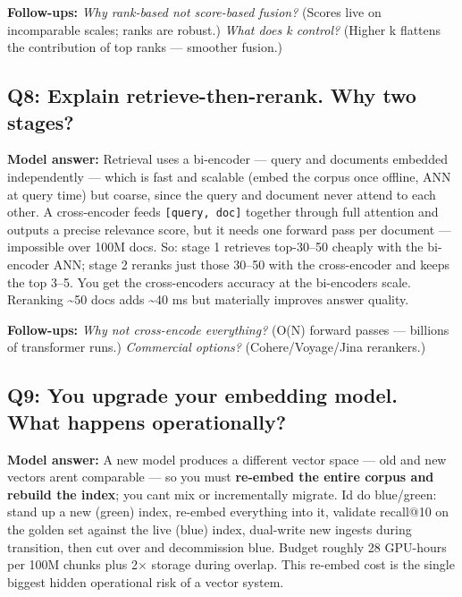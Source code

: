 \documentclass[11pt]{article}
\begin{document}
\textbf{Follow-ups:} \emph{Why rank-based not score-based fusion?} (Scores live on incomparable scales; ranks are robust.) \emph{What does k control?} (Higher k flattens the contribution of top ranks --- smoother fusion.)

\subsection{Q8: Explain retrieve-then-rerank. Why two stages?}\label{q8-explain-retrieve-then-rerank-why-two-stages}

\textbf{Model answer:} Retrieval uses a bi-encoder --- query and documents embedded independently --- which is fast and scalable (embed the corpus once offline, ANN at query time) but coarse, since the query and document never attend to each other. A cross-encoder feeds \texttt{{[}query,\ doc{]}} together through full attention and outputs a precise relevance score, but it needs one forward pass per document --- impossible over 100M docs. So: stage 1 retrieves top-30--50 cheaply with the bi-encoder ANN; stage 2 reranks just those 30--50 with the cross-encoder and keeps the top 3--5. You get the cross-encoder\textquotesingle s accuracy at the bi-encoder\textquotesingle s scale. Reranking \textasciitilde50 docs adds \textasciitilde40 ms but materially improves answer quality.

\textbf{Follow-ups:} \emph{Why not cross-encode everything?} (O(N) forward passes --- billions of transformer runs.) \emph{Commercial options?} (Cohere/Voyage/Jina rerankers.)

\subsection{Q9: You upgrade your embedding model. What happens operationally?}\label{q9-you-upgrade-your-embedding-model-what-happens-operationally}

\textbf{Model answer:} A new model produces a different vector space --- old and new vectors aren\textquotesingle t comparable --- so you must \textbf{re-embed the entire corpus and rebuild the index}; you can\textquotesingle t mix or incrementally migrate. I\textquotesingle d do blue/green: stand up a new (green) index, re-embed everything into it, validate recall@10 on the golden set against the live (blue) index, dual-write new ingests during transition, then cut over and decommission blue. Budget roughly 28 GPU-hours per 100M chunks plus 2\(\times\) storage during overlap. This re-embed cost is the single biggest hidden operational risk of a vector system.
\end{document}
